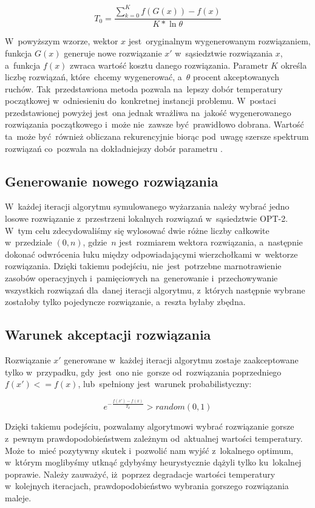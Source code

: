 \begin{equation}
	T_0 = \frac{\sum_{k=0}^{K} f(G(x)) - f(x)}{K * \ln \theta}
\end{equation}

W~powyższym wzorze, wektor $x$ jest~oryginalnym wygenerowanym rozwiązaniem, funkcja $G(x)$ generuje nowe rozwiązanie $x'$ w~sąsiedztwie rozwiązania $x$, a~funkcja $f(x)$ zwraca wartość kosztu danego rozwiązania. Parametr $K$ określa liczbę rozwiązań, które~chcemy wygenerować, a~$\theta$ procent akceptowanych ruchów. Tak~przedstawiona metoda pozwala na~lepszy dobór temperatury początkowej w~odniesieniu do~konkretnej instancji problemu. W~postaci przedstawionej powyżej jest~ona jednak wrażliwa na~jakość wygenerowanego rozwiązania początkowego i~może nie~zawsze być~prawidłowo dobrana. Wartość ta~może być~również obliczana rekurencyjnie biorąc pod~uwagę szersze spektrum rozwiązań co~pozwala na dokładniejszy dobór parametru \cite{saTemperature}. 


\subsection{Generowanie nowego rozwiązania}
W~każdej iteracji algorytmu symulowanego wyżarzania należy wybrać jedno losowe rozwiązanie z~przestrzeni lokalnych rozwiązań w~sąsiedztwie OPT-2. W~tym celu zdecydowaliśmy się wylosować dwie różne liczby całkowite w~przedziale $(0, n)$, gdzie~$n$ jest~rozmiarem wektora rozwiązania, a~następnie dokonać odwrócenia łuku między odpowiadającymi wierzchołkami w~wektorze rozwiązania. Dzięki takiemu podejściu, nie~jest~potrzebne marnotrawienie zasobów operacyjnych i~pamięciowych na~generowanie i~przechowywanie wszystkich rozwiązań dla~danej iteracji algorytmu, z~których następnie wybrane zostałoby tylko pojedyncze rozwiązanie, a~reszta byłaby zbędna.


\subsection{Warunek akceptacji rozwiązania}
Rozwiązanie $x'$ generowane w~każdej iteracji algorytmu zostaje zaakceptowane tylko w~przypadku, gdy~jest~ono nie~gorsze od~rozwiązania poprzedniego $f(x') <= f(x)$, lub~spełniony jest~warunek probabilistyczny:

\begin{equation}
	e^{-\frac{f(x') - f(x)}{T_k}} > random(0, 1)
\end{equation} 

Dzięki takiemu podejściu, pozwalamy algorytmowi wybrać rozwiązanie gorsze z~pewnym prawdopodobieństwem zależnym od~aktualnej wartości temperatury. Może to~mieć pozytywny skutek i~pozwolić nam wyjść z~lokalnego optimum, w~którym moglibyśmy utknąć gdybyśmy heurystycznie dążyli tylko ku~lokalnej poprawie. Należy zauważyć, iż~poprzez degradacje wartości temperatury w~kolejnych iteracjach, prawdopodobieństwo wybrania gorszego rozwiązania maleje.


